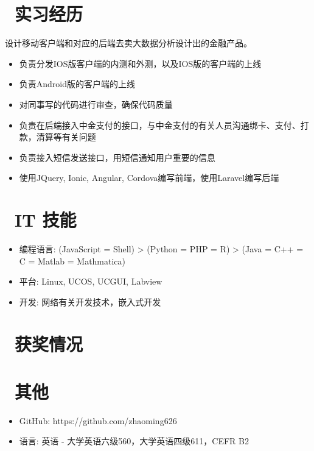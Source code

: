 \documentclass{resume}
\begin{document}
\section{\faUsers\ 实习经历}
设计移动客户端和对应的后端去卖大数据分析设计出的金融产品。
\begin{itemize}
  \item 负责分发IOS版客户端的内测和外测，以及IOS版的客户端的上线
  \item 负责Android版的客户端的上线
  \item 对同事写的代码进行审查，确保代码质量
  \item 负责在后端接入中金支付的接口，与中金支付的有关人员沟通绑卡、支付、打款，清算等有关问题
  \item 负责接入短信发送接口，用短信通知用户重要的信息
  \item 使用JQuery, Ionic, Angular, Cordova编写前端，使用Laravel编写后端
\end{itemize}

\section{\faCogs\ IT 技能}
\begin{itemize}[parsep=0.5ex]
  \item 编程语言: (JavaScript = Shell) > (Python = PHP = R) > (Java = C++ = C = Matlab =
Mathmatica)
  \item 平台: Linux, UCOS, UCGUI, Labview
  \item 开发: 网络有关开发技术，嵌入式开发
\end{itemize}

\section{\faHeartO\ 获奖情况}

\section{\faInfo\ 其他}
\begin{itemize}[parsep=0.5ex]
  \item GitHub: https://github.com/zhaoming626
  \item 语言: 英语 - 大学英语六级560，大学英语四级611，CEFR B2
\end{itemize}

%
%
\end{document}

